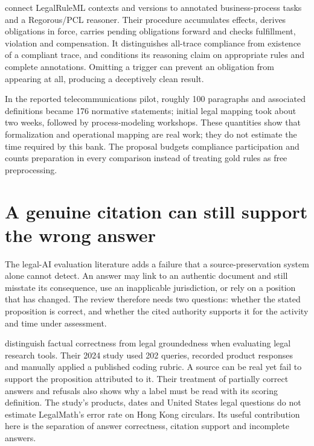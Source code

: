 \documentclass[12pt,a4paper,oneside,openany]{book}
\begin{document}
\citet[secs.~3--4]{semanticcompliance2016} connect LegalRuleML contexts and
versions to annotated business-process tasks and a Regorous/PCL reasoner. Their
procedure accumulates effects, derives obligations in force, carries pending
obligations forward and checks fulfillment, violation and compensation. It
distinguishes all-trace compliance from existence of a compliant trace, and
conditions its reasoning claim on appropriate rules and complete annotations.
Omitting a trigger can prevent an obligation from appearing at all, producing a
deceptively clean result.

In the reported telecommunications pilot, roughly 100 paragraphs and associated
definitions became 176 normative statements; initial legal mapping took about
two weeks, followed by process-modeling workshops. These quantities show that
formalization and operational mapping are real work; they do not estimate the
time required by this bank. The proposal budgets compliance participation and
counts preparation in every comparison instead of treating gold rules as free
preprocessing.

\section{A genuine citation can still support the wrong answer}
\label{sec:legal-ai-source-support}

The legal-AI evaluation literature adds a failure that a source-preservation
system alone cannot detect. An answer may link to an authentic document and
still misstate its consequence, use an inapplicable jurisdiction, or rely on a
position that has changed. The review therefore needs two questions: whether
the stated proposition is correct, and whether the cited authority supports it
for the activity and time under assessment.

\citet[sections 4--5 and appendix C]{legalrag2024} distinguish factual
correctness from legal groundedness when evaluating legal research tools. Their
2024 study used 202 queries, recorded product responses and manually applied
a published coding rubric. A source can be real yet fail to support the
proposition attributed to it. Their treatment of partially correct answers and
refusals also shows why a label must be read with its scoring definition. The
study's products, dates and United States legal questions do not estimate
LegalMath's error rate on Hong Kong circulars. Its useful contribution here is
the separation of answer correctness, citation support and incomplete answers.
\end{document}
